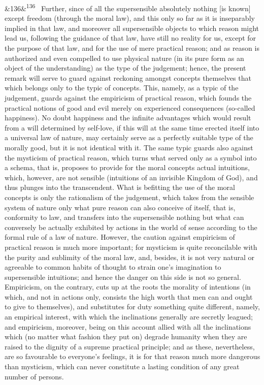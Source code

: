 \documentclass[12pt]{article}
\newcommand{\para}[1][]{\par\noindent\ifx&#1&\else\textsuperscript{\footnotesize #1}~\fi}
\begin{document}
\para[136] Further, since of all the supersensible absolutely nothing [is known] except freedom (through the moral law), and this only so far as it is inseparably implied in that law, and moreover all supersensible objects to which reason might lead us, following the guidance of that law, have still no reality for us, except for the purpose of that law, and for the use of mere practical reason; and as reason is authorized and even compelled to use physical nature (in its pure form as an object of the understanding) as the type of the judgement; hence, the present remark will serve to guard against reckoning amongst concepts themselves that which belongs only to the typic of concepts. This, namely, as a typic of the judgement, guards against the empiricism of practical reason, which founds the practical notions of good and evil merely on experienced consequences (so-called happiness). No doubt happiness and the infinite advantages which would result from a will determined by self-love, if this will at the same time erected itself into a universal law of nature, may certainly serve as a perfectly suitable type of the morally good, but it is not identical with it. The same typic guards also against the mysticism of practical reason, which turns what served only as a symbol into a schema, that is, proposes to provide for the moral concepts actual intuitions, which, however, are not sensible (intuitions of an invisible Kingdom of God), and thus plunges into the transcendent. What is befitting the use of the moral concepts is only the rationalism of the judgement, which takes from the sensible system of nature only what pure reason can also conceive of itself, that is, conformity to law, and transfers into the supersensible nothing but what can conversely be actually exhibited by actions in the world of sense according to the formal rule of a law of nature. However, the caution against empiricism of practical reason is much more important; for mysticism is quite reconcilable with the purity and sublimity of the moral law, and, besides, it is not very natural or agreeable to common habits of thought to strain one's imagination to supersensible intuitions; and hence the danger on this side is not so general. Empiricism, on the contrary, cuts up at the roots the morality of intentions (in which, and not in actions only, consists the high worth that men can and ought to give to themselves), and substitutes for duty something quite different, namely, an empirical interest, with which the inclinations generally are secretly leagued; and empiricism, moreover, being on this account allied with all the inclinations which (no matter what fashion they put on) degrade humanity when they are raised to the dignity of a supreme practical principle; and as these, nevertheless, are so favourable to everyone's feelings, it is for that reason much more dangerous than mysticism, which can never constitute a lasting condition of any great number of persons.
\end{document}
